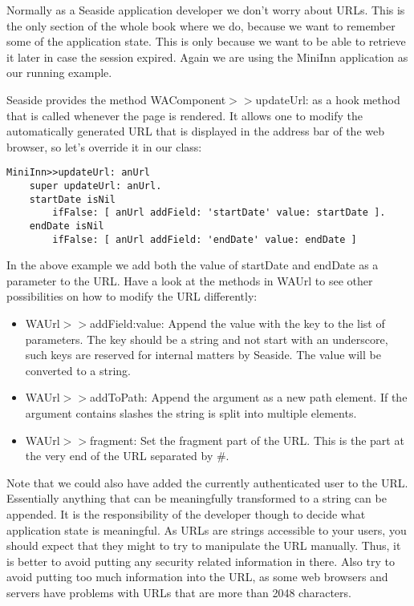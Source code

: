 \documentclass[a4paper,10pt,twoside]{book}
\newcommand{\ct}[1]{{\small\ttfamily\textup{#1}}}
\begin{document}
Normally as a Seaside application developer we don't worry about URLs. This is the only section of the whole book where we do, because we want to remember some of the application state. This is only because we want to be able to retrieve it later in case the session expired. Again we are using the MiniInn application as our running example.

Seaside provides the method  \ct{WAComponent$>$$>$updateUrl:} as a hook method that is called whenever the page is rendered. It allows one to modify the automatically generated URL that is displayed in the address bar of the web browser, so let's override it in our class:

\begin{lstlisting}
MiniInn>>updateUrl: anUrl
    super updateUrl: anUrl.
    startDate isNil
        ifFalse: [ anUrl addField: 'startDate' value: startDate ].
    endDate isNil
        ifFalse: [ anUrl addField: 'endDate' value: endDate ]
\end{lstlisting}

In the above example we add both the value of \ct{startDate} and \ct{endDate} as a parameter to the URL. Have a look at the methods in  \ct{WAUrl} to see other possibilities on how to modify the URL
differently:

\begin{itemize}
\item  \ct{WAUrl$>$$>$addField:value:}  Append the value with the key to the list of parameters. The key should be a string and not start with an underscore, such keys are reserved for internal matters by Seaside. The value will be converted to a string.
\item  \ct{WAUrl$>$$>$addToPath:}  Append the argument as a new path element. If the argument contains slashes the string is split into  multiple elements.
\item  \ct{WAUrl$>$$>$fragment:}  Set the fragment part of the URL. This is the part at the very end of the URL separated by  \ct{\#}.
\end{itemize}

Note that we could also have added the currently authenticated user to the URL. Essentially anything that can be meaningfully transformed to a string can be appended. It is the responsibility of the developer though to decide what application state is meaningful. As URLs are strings accessible to your users, you should expect that they might to try to manipulate the URL manually. Thus, it is better to avoid putting any security related information in there. Also try to avoid putting too much information into the URL, as some web browsers and servers have problems with URLs that are more than 2048 characters.
\end{document}
